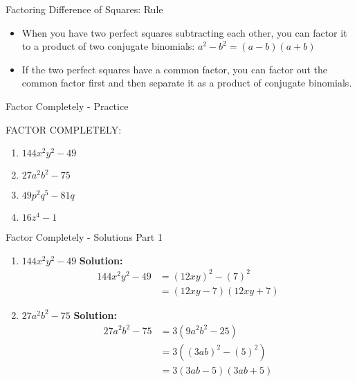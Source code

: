 \documentclass[aspectratio=169]{beamer}
\begin{document}
\begin{frame}{Factoring Difference of Squares: Rule}
    \begin{tcolorbox}[colback=lightgray,colframe=primary,title=Rule]
        \footnotesize
        \begin{itemize}
            \item When you have two perfect squares subtracting each other, you can factor it to a product of two conjugate binomials:
            \quad $a^2 - b^2 = (a - b)(a + b)$
            \item If the two perfect squares have a common factor, you can factor out the common factor first and then separate it as a product of conjugate binomials.
        \end{itemize}
    \end{tcolorbox}
\end{frame}

\begin{frame}{Factor Completely - Practice}
    \begin{tcolorbox}[colback=lightgray,colframe=primary,title=Practice Problems]
        \footnotesize
        FACTOR COMPLETELY:
        \begin{enumerate}
            \setlength{\itemsep}{0.5em}
            \item $144x^2y^2 - 49$
            \item $27a^2b^2 - 75$
            \item $49p^2q^5 - 81q$
            \item $16z^4 - 1$
        \end{enumerate}
    \end{tcolorbox}
\end{frame}

\begin{frame}{Factor Completely - Solutions Part 1}
    \begin{tcolorbox}[colback=lightgray,colframe=accent,title=Detailed Solutions]
        \footnotesize
        \begin{enumerate}
            \setlength{\itemsep}{0.5em}
            \item $144x^2y^2 - 49$
            \quad \textbf{Solution:}
            \begin{align*}
                144x^2y^2 - 49 &= (12xy)^2 - (7)^2 \\
                &= (12xy - 7)(12xy + 7)
            \end{align*}
            \item $27a^2b^2 - 75$
            \quad \textbf{Solution:}
            \begin{align*}
                27a^2b^2 - 75 &= 3(9a^2b^2 - 25) \\
                &= 3((3ab)^2 - (5)^2) \\
                &= 3(3ab - 5)(3ab + 5)
            \end{align*}
        \end{enumerate}
    \end{tcolorbox}
\end{frame}
\end{document}
